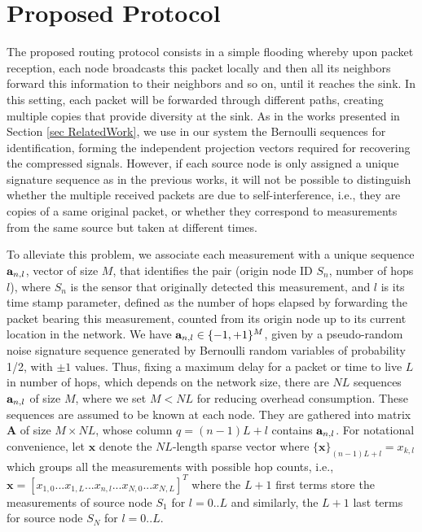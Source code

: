 \documentclass[letterpaper,conference]{IEEEtran}
\begin{document}
\section{Proposed Protocol}
\label{sec Algo}

The proposed routing protocol consists in a simple flooding whereby upon packet reception, each node broadcasts this packet locally and then all its neighbors forward this information to their neighbors and so on, until it reaches the sink. In this setting, each packet will be forwarded through different paths, creating multiple copies that provide diversity at the sink. As in the works presented in Section \ref{sec RelatedWork}, we use in our system the Bernoulli sequences for identification, forming the independent projection vectors required for recovering the compressed signals.
However, if each source node is only assigned a unique signature sequence as in the previous works, it will not be possible to distinguish whether the multiple received packets are due to self-interference, i.e., they are copies of a same original packet, or whether they correspond to measurements from the same source but taken at different times.

To alleviate this problem, we associate each measurement with a unique sequence $\mbox{\bf a}_{n,l}$, vector of size $M$, that identifies the pair (origin node ID $S_n$, number of hops $l$), where $S_n$ is the sensor that originally detected this measurement, and $l$ is its time stamp parameter, defined as the number of hops elapsed by forwarding the packet bearing this measurement, counted from its origin node up to its current location in the network.
We have $\mbox{\bf a}_{n,l} \in \{-1,+1\}^M$, given by a pseudo-random noise signature sequence generated by Bernoulli random variables of probability 1/2, with $\pm 1$ values. Thus, fixing a maximum delay for a packet or time to live $L$ in number of hops, which depends on the network size, there are $N L$ sequences $\mbox{\bf a}_{n,l}$ of size $M$, where we set $M< NL$ for reducing overhead consumption. These sequences are assumed to be known at each node.
They are gathered into matrix $\mathbf{A}$ of size $M \times NL$, whose column $q=(n-1)L+l$ contains $\mbox{\bf a}_{n,l}$.
For notational convenience, let $\mathbf{x}$ denote the $NL$-length sparse vector where $\{\mathbf{x}\}_{(n-1)L+l}=x_{k,l}$ which groups all the measurements with possible hop counts, i.e., $\mathbf{x}=[x_{1,0}...x_{1,L}...x_{n,l}...x_{N,0}...x_{N,L}]^T$ where the $L+1$ first terms store the measurements of source node $S_1$ for $l=0..L$ and similarly, the $L+1$ last terms for source node $S_N$ for $l=0..L$.
\end{document}
